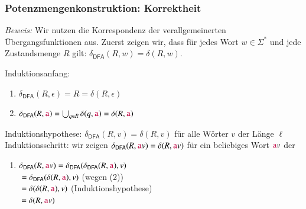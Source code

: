 \documentclass[aspectratio=1610,onlymath]{beamer}
\begin{document}
\begin{frame}[t]\frametitle{Potenzmengenkonstruktion: Korrektheit}


\emph{Beweis:} Wir nutzen die Korrespondenz der verallgemeinerten Übergangsfunktionen aus. Zuerst zeigen wir,
dass für jedes Wort $w\in\Sigma^*$ und jede Zustandsmenge $R$ gilt: $\delta_{\textsf{DFA}}(R,w) = \delta(R,w)$.\pause
\medskip

\alert{Induktionsanfang:}
\begin{enumerate}[(1)]
\item $\delta_{\textsf{DFA}}(R,\epsilon) = R = \delta(R,\epsilon)$\pause
\item $\delta_{\textsf{DFA}}(R,\mathtt{\textcolor{purple}{a}}) = \bigcup_{q\in R}\delta(q,\mathtt{\textcolor{purple}{a}}) = \delta(R,\mathtt{\textcolor{purple}{a}})$\pause
\end{enumerate}\medskip

\alert{Induktionshypothese:} $\delta_{\textsf{DFA}}(R,v) = \delta(R,v)$ für alle Wörter $v$ der Länge $\ell$\\[1ex]
\alert{Induktionsschritt:} wir zeigen $\delta_{\textsf{DFA}}(R,\mathtt{\textcolor{purple}{a}}v) = \delta(R,\mathtt{\textcolor{purple}{a}}v)$ für ein beliebiges Wort $\mathtt{\textcolor{purple}{a}}v$ der 
\begin{enumerate}[(3)]
\item $\delta_{\textsf{DFA}}(R,\mathtt{\textcolor{purple}{a}}v) = \delta_{\textsf{DFA}}(\delta_{\textsf{DFA}}(R,\mathtt{\textcolor{purple}{a}}),v)$\\\pause
\hspace{1.58cm}${}= \delta_{\textsf{DFA}}(\delta(R,\mathtt{\textcolor{purple}{a}}),v)$ \hspace{1cm}(wegen (2))\\\pause
\hspace{1.58cm}${}= \delta(\delta(R,\mathtt{\textcolor{purple}{a}}),v)$ \hspace{1.45cm}(Induktionshypothese)\\\pause
\hspace{1.58cm}${}= \delta(R,\mathtt{\textcolor{purple}{a}}v)$
\end{enumerate}

\end{frame}
\end{document}
